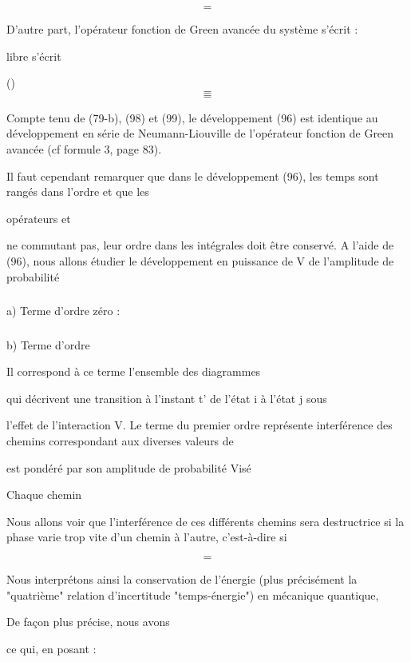 \[
\tag{98}=
\]

D'autre part, l'opérateur fonction de Green avancée du système
 s'écrit :

libre  s'écrit

()
\[
\tag{99}=
\]
\[
\tag{100}=
\]


Compte tenu de (79-b), (98) et (99), le développement (96) est identique au
développement en série de Neumann-Liouville de l'opérateur fonction de Green
avancée (cf formule 3, page 83).

Il faut cependant remarquer que dans le développement (96),
les temps sont rangés  dans l'ordre  et que les

opérateurs  et 

ne commutant pas, leur ordre dans les intégrales doit être conservé.
A l'aide de (96), nous allons étudier le développement en
puissance de V de l'amplitude de probabilité

\subsubsection{}%
a) Terme d'ordre zéro :

\subsubsection{}%
b) Terme d'ordre 

Il correspond à ce terme l'ensemble des diagrammes

qui décrivent une transition à l'instant t' de l'état i à l'état j sous

l'effet de l'interaction V. Le terme du premier ordre représente  interférence
des chemins correspondant aux diverses valeurs de 

est pondéré par son amplitude de probabilité  Visé

Chaque chemin

%
 
Nous allons voir que l'interférence de ces différents
chemins sera destructrice si la phase varie trop vite d'un chemin
à l'autre, c'est-à-dire si

\[
\tag{101}=
\]

Nous interprétons ainsi la conservation de l'énergie
(plus précisément la "quatrième" relation d'incertitude "temps-énergie") en mécanique quantique,

De façon plus précise, nous avons

ce qui, en posant :

